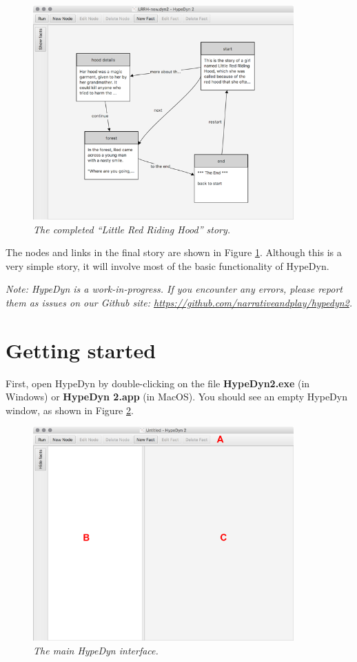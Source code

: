 \documentclass{article}
\begin{document}
\begin{figure}[ht]
  \centering
  \includegraphics[width=10cm]{images/hypedyn-tutorial-1-figure-1}
  \caption{\textit{The completed ``Little Red Riding Hood'' story.}}
  \label{fig:tut1:completed_story}
\end{figure} 

The nodes and links in the final story are shown in Figure \ref{fig:tut1:completed_story}. Although this is a very simple story, it will involve most of the basic functionality of HypeDyn.

\textit{Note:  HypeDyn is a work-in-progress. If you encounter any errors, please report them as issues on our Github site: \url{https://github.com/narrativeandplay/hypedyn2}.}

\section{Getting started}

First, open HypeDyn by double-clicking on the file \textbf{HypeDyn2.exe} (in Windows) or \textbf{HypeDyn 2.app} (in MacOS). You should see an empty HypeDyn window, as shown in Figure \ref{fig:tut1:hypedyn}.

\begin{figure}[ht]
  \centering
  \includegraphics[width=10cm]{images/hypedyn-tutorial-1-figure-2}
  \caption{\textit{The main HypeDyn interface.}}
  \label{fig:tut1:hypedyn}
\end{figure} 
\end{document}
